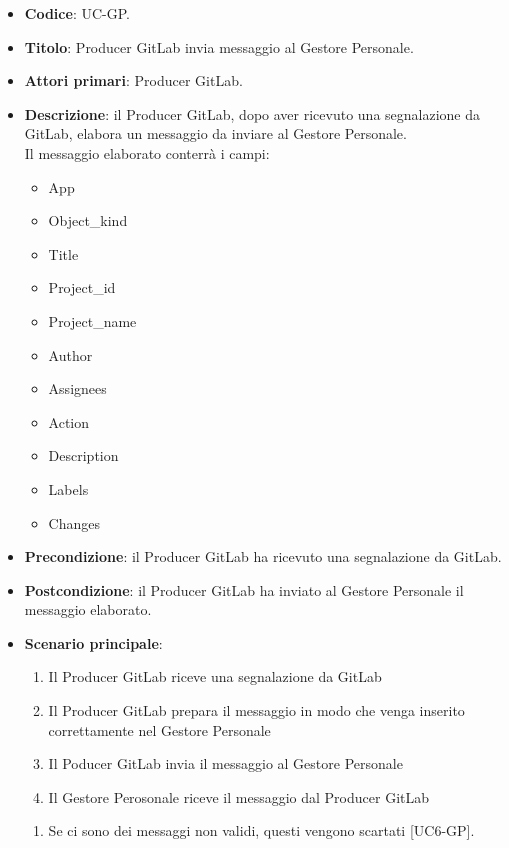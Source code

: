 	\begin{itemize}
		\item \textbf{Codice}: UC\theuccount-GP.
		\item \textbf{Titolo}: Producer GitLab invia messaggio al Gestore Personale.
		\item \textbf{Attori primari}: Producer GitLab.
		\item \textbf{Descrizione}: il Producer GitLab, dopo aver ricevuto una segnalazione da GitLab, elabora un messaggio da inviare al Gestore Personale. \\ Il messaggio elaborato conterrà i campi:
		\begin{itemize}
			\item App
			\item Object\_kind
			\item Title
			\item Project\_id
			\item Project\_name
			\item Author
			\item Assignees
			\item Action
			\item Description
			\item Labels
			\item Changes
		\end{itemize}
		\item \textbf{Precondizione}: il Producer GitLab ha ricevuto una segnalazione da GitLab.
		\item \textbf{Postcondizione}: il Producer GitLab ha inviato al Gestore Personale il messaggio  \newline elaborato.
		\item \textbf{Scenario principale}:
		\begin{enumerate}
			\item Il Producer GitLab riceve una segnalazione da GitLab
			\item Il Producer GitLab prepara il messaggio in modo che venga inserito correttamente nel Gestore Personale
			\item Il Poducer GitLab invia il messaggio al Gestore Personale
            \item Il Gestore Perosonale riceve il messaggio dal Producer GitLab
		\end{enumerate}
        \begin{enumerate}
            \item Se ci sono dei messaggi non validi, questi vengono scartati [UC6-GP].
        \end{enumerate}
	\end{itemize}

